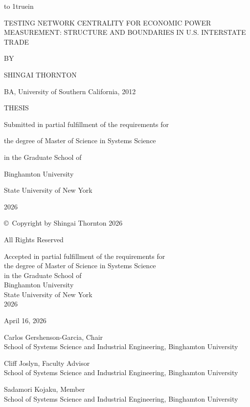 \documentclass[12pt,oneside]{book}
\begin{document}
\frontmatter

\thispagestyle{empty}
\vbox to 1truein{}

\begin{center}
\begin{singlespace}
\MakeUppercase{Testing Network Centrality for Economic Power Measurement: Structure and Boundaries in U.S. Interstate Trade}
\end{singlespace}
\end{center}

\vskip 200pt

\centerline{BY}
\vskip 10pt
\centerline{SHINGAI THORNTON}
\vskip 10pt
\centerline{BA, University of Southern California, 2012}
\vskip 10pt

\vskip 80pt

\centerline{THESIS}
\vskip 10pt
\centerline{Submitted in partial fulfillment of the requirements for}
\centerline{the degree of Master of Science in Systems Science}
\centerline{in the Graduate School of}
\centerline{Binghamton University}
\centerline{State University of New York}
\centerline{2026}

\clearpage
\thispagestyle{empty}
\null
\vfill
\centerline{\copyright\ Copyright by Shingai Thornton 2026}
\vskip 12pt
\centerline{All Rights Reserved}

\newpage
\setcounter{page}{3}
\null
\vfill

{\centering
Accepted in partial fulfillment of the requirements for\\
the degree of Master of Science in Systems Science\\
in the Graduate School of\\
Binghamton University\\
State University of New York\\
2026\par

\vskip 20pt

April 16, 2026\par

\vskip 20pt

Carlos Gershenson-Garcia, Chair\\
School of Systems Science and Industrial Engineering, Binghamton University\par

\vskip 20pt

Cliff Joslyn, Faculty Advisor\\
School of Systems Science and Industrial Engineering, Binghamton University\par

\vskip 20pt

Sadamori Kojaku, Member\\
School of Systems Science and Industrial Engineering, Binghamton University\par
}
\end{document}
